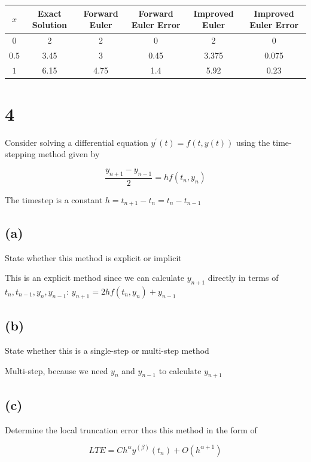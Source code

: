 \documentclass[11pt]{article}
\begin{document}
\begin{table}[h]
  \centering
  \begin{tabular}{|c|c|c|c|c|c|}
      \hline
      $x$ & Exact Solution & Forward Euler & Forward Euler Error & Improved Euler & Improved Euler Error \\
      \hline
      $0$ & 2 & 2 & 0 & 2 & 0 \\
      $0.5$ & 3.45 & 3 & 0.45 & 3.375 & 0.075 \\
      $1$ & 6.15 & 4.75 & 1.4 & 5.92 & 0.23 \\
      \hline
  \end{tabular}
\end{table}

\section{4}

Consider solving a differential equation $y^\prime(t) = f(t,y(t))$ using the time-stepping method given by

\[ \dfrac{y_{n+1} - y_{n-1}}{2} = h f(t_n, y_n) \]

The timestep is a constant $h = t_{n+1} - t_n = t_n - t_{n-1}$

\subsection{(a)}

State whether this method is explicit or implicit

This is an explicit method since we can calculate $y_{n+1}$ directly in terms of $t_n, t_{n-1}, y_n, y_{n-1}$: $y_{n+1} = 2hf(t_n, y_n) + y_{n-1}$

\subsection{(b)}

State whether this is a single-step or multi-step method

Multi-step, because we need $y_n$ and $y_{n-1}$ to calculate $y_{n+1}$

\subsection{(c)}

Determine the local truncation error thos this method in the form of

\[ LTE = Ch^\alpha y^(\beta) (t_n) + O(h^{\alpha + 1}) \]
\end{document}

